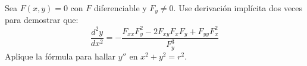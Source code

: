 Sea $F(x, y) = 0$ con $F$ diferenciable y $F_y \neq 0$. Use derivación implícita dos veces para demostrar que:
\[
\frac{d^2 y}{dx^2} = -\frac{F_{xx}F_y^2 - 2F_{xy}F_x F_y + F_{yy}F_x^2}{F_y^3}
\]
Aplique la fórmula para hallar $y''$ en $x^2 + y^2 = r^2$.
